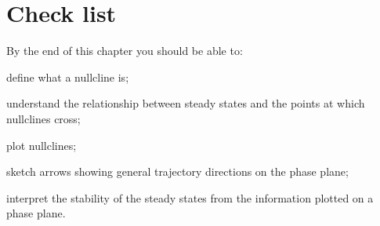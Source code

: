 \section{Check list}
By the end of this chapter you should be able to:
\begin{todolist}
\item define what a nullcline is;
\item understand the relationship between steady states and the points at which nullclines cross;
\item plot nullclines;
\item sketch arrows showing general trajectory directions on the phase plane;
\item interpret the stability of the steady states from the information plotted on a phase plane.
\end{todolist}





